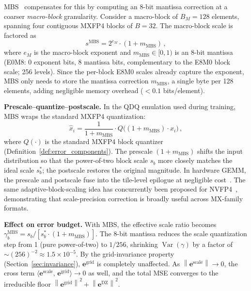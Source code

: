 \documentclass{article}
\theoremstyle{definition}
\theoremstyle{remark}
\DeclareMathOperator{\Var}{Var}
\newcommand{\be}{\bm{e}}
\newcommand{\norm}[1]{\left\|#1\right\|}
\newcommand{\inner}[2]{\langle #1,\, #2 \rangle}
\begin{document}
MBS~\citep{chhugani2026mxfp4} compensates for this by computing an 8-bit mantissa correction at a coarser \emph{macro-block} granularity. Consider a macro-block of $B_M = 128$ elements, spanning four contiguous MXFP4 blocks of $B = 32$. The macro-block scale is factored as
\begin{equation}
\label{eq:mbs_factor}
  s^{\mathrm{MBS}} = 2^{e_M} \cdot (1 + m_{\mathrm{MBS}})\,,
\end{equation}
where $e_M$ is the macro-block exponent and $m_{\mathrm{MBS}} \in [0, 1)$ is an 8-bit mantissa (E0M8: 0 exponent bits, 8 mantissa bits, complementary to the E8M0 block scale; 256 levels). Since the per-block E8M0 scales already capture the exponent, MBS only needs to store the mantissa correction $m_{\mathrm{MBS}}$, a single byte per 128 elements, adding negligible memory overhead ($< 0.1$ bits/element).

\textbf{Prescale--quantize--postscale.}
In the QDQ emulation used during training, MBS wraps the standard MXFP4 quantization:
\begin{equation}
\label{eq:mbs_qdq}
  \hat{x}_i = \frac{1}{1 + m_{\mathrm{MBS}}} \cdot Q\!\bigl((1 + m_{\mathrm{MBS}}) \cdot x_i\bigr)\,,
\end{equation}
where $Q(\cdot)$ is the standard MXFP4 block quantizer (Definition~\ref{def:error_components}). The prescale $(1 + m_{\mathrm{MBS}})$ shifts the input distribution so that the power-of-two block scale $s_b$ more closely matches the ideal scale $s_b^*$; the postscale restores the original magnitude. In hardware GEMM, the prescale and postscale fuse into the tile-level epilogue at negligible cost~\citep{chhugani2026mxfp4}. The same adaptive-block-scaling idea has concurrently been proposed for NVFP4~\citep{cook2025fouroversix}, demonstrating that scale-precision correction is broadly useful across MX-family formats.

\textbf{Effect on error budget.}
With MBS, the effective scale ratio becomes $\gamma_b^{\mathrm{MBS}} = s_b / [s_b^* \cdot (1 + m_{\mathrm{MBS}})]$. The 8-bit mantissa reduces the scale quantization step from 1 (pure power-of-two) to $1/256$, shrinking $\Var(\gamma)$ by a factor of ${\sim}(256)^{-2} \approx 1.5 \times 10^{-5}$. By the grid-invariance property (Section~\ref{sec:invariance}), $\be^{\mathrm{grid}}$ is completely unaffected. As $\norm{\be^{\mathrm{scale}}} \to 0$, the cross term $\inner{\be^{\mathrm{scale}}}{\be^{\mathrm{grid}}} \to 0$ as well, and the total MSE converges to the irreducible floor $\norm{\be^{\mathrm{grid}}}^2 + \norm{\be^{\mathrm{DZ}}}^2$.
\end{document}
